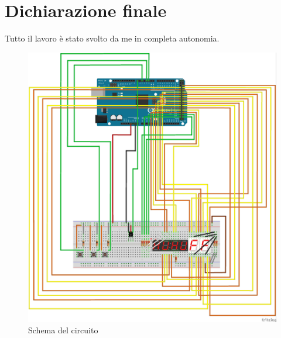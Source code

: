 \documentclass[paper=a4, fontsize=10pt]{scrartcl}
\begin{document}
\section{Dichiarazione finale}
Tutto il lavoro è stato svolto da me in completa autonomia.

\begin{figure}
  \includegraphics[width=\linewidth]{MySchema.jpg}
  \caption{Schema del circuito}
  \label{fig:schema1}
\end{figure}
\end{document}
